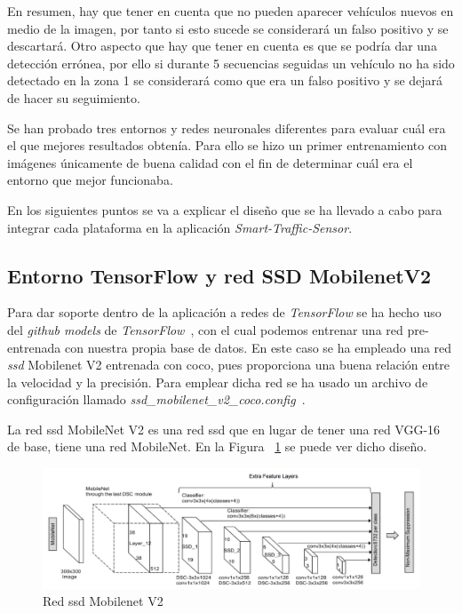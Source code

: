 En resumen, hay que tener en cuenta que no pueden aparecer vehículos nuevos en medio de la imagen, por tanto si esto sucede se considerará un falso positivo y se descartará. Otro aspecto que hay que tener en cuenta es que se podría dar una detección errónea, por ello si durante 5 secuencias seguidas un vehículo no ha sido detectado en la zona 1 se considerará como que era un falso positivo y se dejará de hacer su seguimiento.

Se han probado tres entornos y redes neuronales diferentes para evaluar cuál era el que mejores resultados obtenía. Para ello se hizo un primer entrenamiento con imágenes únicamente de buena calidad con el fin de determinar cuál era el entorno que mejor funcionaba.


En los siguientes puntos se va a explicar el diseño que se ha llevado a cabo para integrar cada plataforma en la aplicación \textit{Smart-Traffic-Sensor}.

\subsection{Entorno TensorFlow y red SSD MobilenetV2}\label{sub.tensorflow}

Para dar soporte dentro de la aplicación a redes de \textit{TensorFlow} se ha hecho uso del \textit{github models} de \textit{TensorFlow}~\cite{tensorflow_models}, con el cual podemos entrenar una red pre-entrenada con nuestra propia base de datos. En este caso se ha empleado una red \textit{\acrfull{ssd}} Mobilenet V2 entrenada con \acrshort{coco}, pues proporciona una buena relación entre la velocidad y la precisión. Para emplear dicha red se ha usado un archivo de configuración llamado \textit{ssd\_mobilenet\_v2\_coco.config}~\cite{ssd_mobilenetv2_config}.

La red \acrshort{ssd} MobileNet V2 es una red \acrshort{ssd} que en lugar de tener una red VGG-16 de base, tiene una red MobileNet. En la Figura ~\ref{fig.ssd_mobilenet} se puede ver dicho diseño.

\begin{figure}[H] 
\begin{center}
	\includegraphics[width=1\textwidth]{figures/Diseno_global/ssd_mobilenet.png}
   \caption{Red \acrshort{ssd} Mobilenet V2}
	\label{fig.ssd_mobilenet}
\end{center}
\end{figure}

